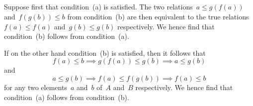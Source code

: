 \subsection{}

Suppose first that condition~(a) is satisfied.
The two relations~$a ≤ g(f(a))$ and~$f(g(b)) ≤ b$ from condition~(b) are then equivalent to the true relations~$f(a) ≤ f(a)$ and~$g(b) ≤ g(b)$ respectively.
We hence find that condition~(b) follows from condition~(a).

If on the other hand condition~(b) is satisfied, then it follows that
\[
	f(a) ≤ b
	\implies
	g(f(a)) ≤ g(b)
	\implies
	a ≤ g(b)
\]
and
\[
	a ≤ g(b)
	\implies
	f(a) ≤ f(g(b))
	\implies
	f(a) ≤ b
\]
for any two elements~$a$ and~$b$ of~$A$ and~$B$ respectively.
We hence find that condition~(a) follows from condition~(b).
